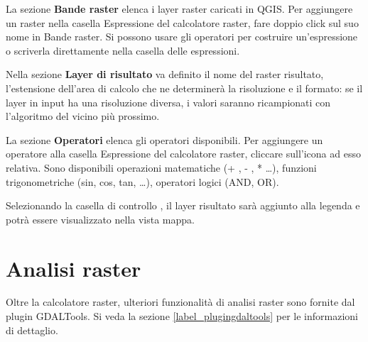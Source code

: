 La sezione \textbf{Bande raster} elenca i layer raster caricati in QGIS.
Per aggiungere un raster nella casella Espressione del calcolatore raster, 
fare doppio click sul suo nome in Bande raster. 
Si possono usare gli operatori per costruire un'espressione o scriverla
direttamente nella casella delle espressioni.

Nella sezione \textbf{Layer di risultato} va definito il nome del raster risultato, 
l'estensione dell'area di calcolo che ne determinerà la risoluzione e il formato: se il layer in 
input ha una risoluzione diversa, i valori saranno ricampionati con l'algoritmo del 
vicino più prossimo.  

La sezione \textbf{Operatori} elenca gli operatori disponibili. Per aggiungere un operatore alla casella 
Espressione del calcolatore raster, cliccare sull'icona ad esso relativa. Sono disponibili 
operazioni matematiche (+ , - , * \dots), funzioni trigonometriche (sin, cos, tan, \dots), operatori 
logici (AND, OR).

Selezionando la casella di controllo , il layer risultato sarà
aggiunto alla legenda e potrà essere visualizzato nella vista mappa.

\section{Analisi raster}\label{sec:raster_analysis}

Oltre la calcolatore raster, ulteriori funzionalità di analisi raster sono fornite dal plugin GDALTools.
Si veda la sezione \ref{label_plugingdaltools} per le informazioni di dettaglio.

\FloatBarrier